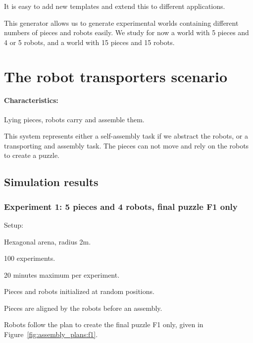 		It is easy to add new templates and extend this to different applications.
		
		This generator allows us to generate experimental worlds containing different numbers of pieces and robots easily. We study for now a world with 5 pieces and 4 or 5 robots, and a world with 15 pieces and 15 robots.
		

\section{The robot transporters scenario} %
\label{sec:the_robot_transporters_scenario}

\paragraph{Characteristics:} %
\label{par:characteristics_}
Lying pieces, robots carry and assemble them.

This system represents either a self-assembly task if we abstract the robots, or a transporting and assembly task. The pieces can not move and rely on the robots to create a puzzle.

\subsection{Simulation results} %
\subsubsection{Experiment 1: 5 pieces and 4 robots, final puzzle F1 only} %
\label{ssub:experiment_1_5_pieces_and_4_robots}

Setup:
\begin{my_itemize}
	\item Hexagonal arena, radius 2m.
	\item 100 experiments.
	\item 20 minutes maximum per experiment.
	\item Pieces and robots initialized at random positions.
	\item Pieces are aligned by the robots before an assembly.
	\item Robots follow the plan to create the final puzzle F1 only, given in Figure~\ref{fig:assembly_plans:f1}.
\end{my_itemize}


